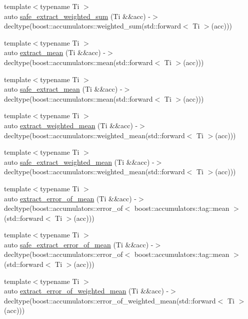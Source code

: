 \begin{DoxyCompactItemize}
\item 
{\footnotesize template$<$typename Ti $>$ }\\auto \hyperlink{namespaceIceBRG_a3300519b0f536b08ac80fbd6e0a68746}{safe\+\_\+extract\+\_\+weighted\+\_\+sum} (Ti \&\&acc) -\/$>$ decltype(boost\+::accumulators\+::weighted\+\_\+sum(std\+::forward$<$ Ti $>$(acc)))
\item 
{\footnotesize template$<$typename Ti $>$ }\\auto \hyperlink{namespaceIceBRG_a4122b8dc1ecb425c81b4db3895c32f9b}{extract\+\_\+mean} (Ti \&\&acc) -\/$>$ decltype(boost\+::accumulators\+::mean(std\+::forward$<$ Ti $>$(acc)))
\item 
{\footnotesize template$<$typename Ti $>$ }\\auto \hyperlink{namespaceIceBRG_aa481db79e7e803a54fac6acd148a04b1}{safe\+\_\+extract\+\_\+mean} (Ti \&\&acc) -\/$>$ decltype(boost\+::accumulators\+::mean(std\+::forward$<$ Ti $>$(acc)))
\item 
{\footnotesize template$<$typename Ti $>$ }\\auto \hyperlink{namespaceIceBRG_a3c40074b2db7040d09500bb38943810c}{extract\+\_\+weighted\+\_\+mean} (Ti \&\&acc) -\/$>$ decltype(boost\+::accumulators\+::weighted\+\_\+mean(std\+::forward$<$ Ti $>$(acc)))
\item 
{\footnotesize template$<$typename Ti $>$ }\\auto \hyperlink{namespaceIceBRG_aa2abdc23aea604106db2956e96a556c3}{safe\+\_\+extract\+\_\+weighted\+\_\+mean} (Ti \&\&acc) -\/$>$ decltype(boost\+::accumulators\+::weighted\+\_\+mean(std\+::forward$<$ Ti $>$(acc)))
\item 
{\footnotesize template$<$typename Ti $>$ }\\auto \hyperlink{namespaceIceBRG_a66390bd354e17fa02cc3b97938eebd30}{extract\+\_\+error\+\_\+of\+\_\+mean} (Ti \&\&acc) -\/$>$ decltype(boost\+::accumulators\+::error\+\_\+of$<$ boost\+::accumulators\+::tag\+::mean $>$(std\+::forward$<$ Ti $>$(acc)))
\item 
{\footnotesize template$<$typename Ti $>$ }\\auto \hyperlink{namespaceIceBRG_af9fda323150adcd72e18ea2a0f580c40}{safe\+\_\+extract\+\_\+error\+\_\+of\+\_\+mean} (Ti \&\&acc) -\/$>$ decltype(boost\+::accumulators\+::error\+\_\+of$<$ boost\+::accumulators\+::tag\+::mean $>$(std\+::forward$<$ Ti $>$(acc)))
\item 
{\footnotesize template$<$typename Ti $>$ }\\auto \hyperlink{namespaceIceBRG_a97a93271bc992491c6279059eff9bc8e}{extract\+\_\+error\+\_\+of\+\_\+weighted\+\_\+mean} (Ti \&\&acc) -\/$>$ decltype(boost\+::accumulators\+::error\+\_\+of\+\_\+weighted\+\_\+mean(std\+::forward$<$ Ti $>$(acc)))

\end{DoxyCompactItemize}
